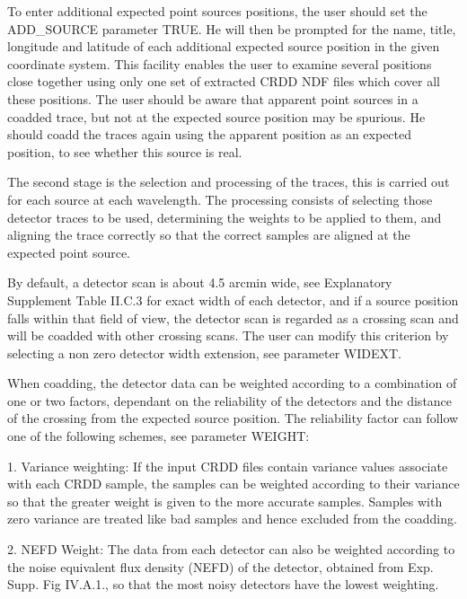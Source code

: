 \documentclass[11pt,nolof,noabs]{starlink}
\begin{document}
\begin{small}
{{      To enter additional expected point sources positions, the user should
      set the ADD\_SOURCE parameter TRUE. He will then be prompted for the
      name, title, longitude and latitude of each additional expected source
      position in the given coordinate system. This facility enables the user
      to examine several positions close together using only one set of
      extracted CRDD NDF files which cover all these positions. The user
      should be aware that apparent point sources in a coadded trace, but not
      at the expected source position may be spurious. He should coadd
      the traces again using the apparent position as an expected position,
      to see whether this source is real.

      The second stage is the selection and processing of the traces, this
      is carried out for each source at each wavelength. The processing
      consists of selecting those detector traces to be used, determining
      the weights to be applied to them, and aligning the trace correctly
      so that the correct samples are aligned at the expected point source.

      By default, a detector scan is about 4.5 arcmin wide, see Explanatory
      Supplement Table II.C.3 for exact width of each detector, and if a
      source position falls within that field of view, the detector
      scan is regarded as a crossing scan and will be coadded with other
      crossing scans. The user can modify this criterion by selecting a
      non zero detector width extension, see parameter WIDEXT.

      When coadding, the detector data can be weighted according to a
      combination of one or two factors, dependant on the reliability of
      the detectors and the distance of the crossing from the expected
      source position. The reliability factor can follow one of the
      following schemes, see parameter WEIGHT:

      1. Variance weighting: If the input CRDD files contain variance
         values associate with each CRDD sample, the samples can be
         weighted according to their variance so that the greater weight
         is given to the more accurate samples. Samples with zero
         variance are treated like bad samples and hence excluded from
         the coadding.

      2. NEFD Weight: The data from each detector can also be weighted
         according to the noise equivalent flux density (NEFD) of the
         detector, obtained from Exp. Supp. Fig IV.A.1., so that the
         most noisy detectors have the lowest weighting.

}}
\end{small}
\end{document}
